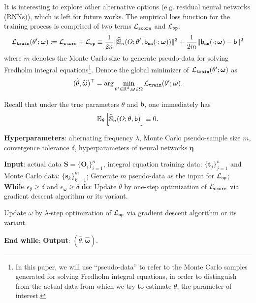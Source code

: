 \documentclass[11pt]{article}
\def\neurosemi{{\normalfont\texttt{neural-semipar}}}
\def\train{\texttt{train}}
\def\op{\texttt{op}}
\def\nn{\texttt{nn}}
\def\score{\texttt{score}}
\begin{document}
It is interesting to explore other alternative options (e.g. residual neural networks (RNNs)), which is left for future works. The empirical loss function for the training process is comprised of two terms $\calL_{\score}$ and $\calL_{\op}$:
\begin{equation}
\label{loss}
\calL_{\train} (\theta'; \bm{\omega}) \coloneqq \calL_{\score} + \calL_{\op} \equiv \frac{1}{2 n} \Vert \hat{\bbS}_{n} (O; \theta', \sfb_{\nn} (\cdot; \bm{\omega})) \Vert^{2} + \frac{1}{2 m} \Vert \sfb_{\nn} (\cdot; \bm{\omega}) - \sfb \Vert^{2}
\end{equation}
where $m$ denotes the Monte Carlo size to generate pseudo-data for solving Fredholm integral equations\footnote{In this paper, we will use ``pseudo-data'' to refer to the Monte Carlo samples generated for solving Fredholm integral equations, in order to distinguish from the actual data from which we try to estimate $\theta$, the parameter of interest.}. Denote the global minimizer of $\calL_{\train} (\theta'; \bm{\omega})$ as
\begin{equation}
(\tilde{\theta}, \tilde{\bm{\omega}})^{\top} = \arg \min_{\theta' \in \bbR^{d}, \bm{\omega} \in \Omega} \calL_{\train} (\theta'; \bm{\omega}).
\end{equation}

Recall that under the true parameters $\theta$ and ${\mathsf{b}}$, one immediately has
\begin{align*}
{\mathbb{E}}_{\theta} \left[ \widehat{{\mathbb{S}}}_{n} (O; \theta, {\mathsf{b}}) \right] \equiv 0.
\end{align*}

\begin{algorithm}
\caption{Pseudocode for the $\neurosemi$ algorithm}\label{alg:fred}
\begin{algorithmic}[1]
\State \textbf{Hyperparameters}: alternating frequency $\lambda$, Monte Carlo pseudo-sample size $m$, convergence tolerance $\delta$, hyperparameters of neural networks $\bm{\eta}$

\State \textbf{Input}: actual data $\bm{S} = \{\bm{O}_i\}_{i=1}^n$, integral equation training data: $\{\bm{t}_j\}_{j=1}^n$ and Monte Carlo data: $\{\bm{s}_k\}_{k=1}^m$;
\State Generate $m$ pseudo-data as the input for $\calL_{\op}$;
\State \textbf{While} $\epsilon_{\theta} \geq \delta$ and $\epsilon_{\bm{\omega}} \geq \delta$ \textbf{do}:
\State Update $\theta$ by one-step optimization of $\calL_{\score}$ via gradient descent algorithm or its variant.

\State Update $\omega$ by $\lambda$-step optimization of $\calL_{\op}$ via gradient descent algorithm or its variant.

\State \textbf{End while};
\State \textbf{Output}: $(\hat{\theta}, \hat{\bm{\omega}})$.
\end{algorithmic}
\end{algorithm}
\end{document}
